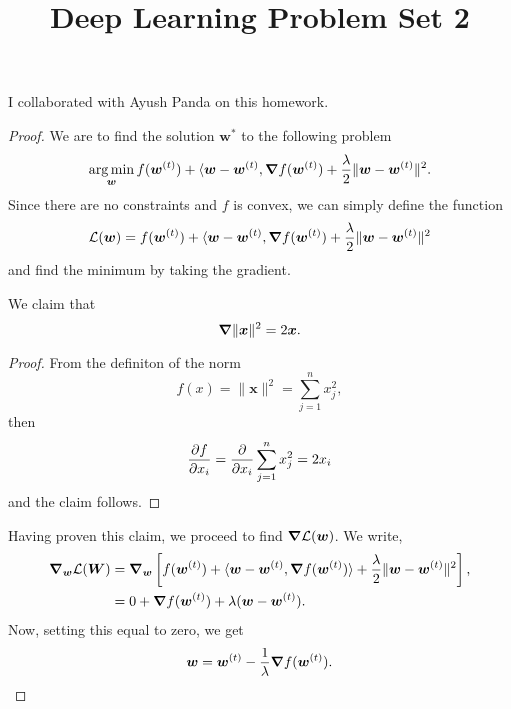 \documentclass[twoside]{article}
\title{Deep Learning Problem Set 2}
\begin{document}
\maketitle

I collaborated with Ayush Panda on this homework.

\begin{proof}
	We are to find the solution $\bm{w}^{*}$ to the following problem
	\begin{equation*}
		\operatorname*{arg\,min}_{\bm{w}} f(\bm{w}^{(t)}) + \langle \bm{w} - \bm{w}^{(t)}, \grad f(\bm{w}^{(t)})
		+ \frac{\lambda}{2} \lVert \bm{w} - \bm{w}^{(t)} \rVert^{2}.
	\end{equation*}
	Since there are no constraints and $f$ is convex, we can simply define the function
	\begin{equation*}
		\mathcal{L}(\bm{w}) = f(\bm{w}^{(t)}) + \langle \bm{w} - \bm{w}^{(t)}, \grad f(\bm{w}^{(t)})
		+ \frac{\lambda}{2} \lVert \bm{w} - \bm{w}^{(t)} \rVert^{2}
	\end{equation*}
	and find the minimum by taking the gradient.

	\begin{claim}
		We claim that
		\begin{equation*}
			\grad \lVert \bm{x} \rVert^{2} = 2\bm{x}.
		\end{equation*}
		\begin{proof}
			From the definiton of the norm
			\begin{equation*}
				f(x) = \lVert \bm{x} \rVert^{2} = \sum_{j = 1}^{n} x_{j}^{2},
			\end{equation*}
			then
			\begin{equation*}
				\pdv{f}{x_{i}} = \pdv{}{x_{i}} \sum_{j = 1}^{n} x_{j}^{2} = 2x_{i}
			\end{equation*}
			and the claim follows.
		\end{proof}
	\end{claim}

	Having proven this claim, we proceed to find $\grad \mathcal{L}(\bm{w})$. We write,
	\begin{align*}
		\grad_{\bm{w}} \mathcal{L}(\bm{W}) & = \grad_{\bm{w}}
		\left[ f(\bm{w}^{(t)}) + \langle \bm{w} - \bm{w}^{(t)}, \grad f(\bm{w}^{(t)})\rangle
		+ \frac{\lambda}{2} \lVert \bm{w} - \bm{w}^{(t)} \rVert^{2} \right],                               \\
		                                   & = 0 + \grad f(\bm{w}^{(t)}) + \lambda(\bm{w} - \bm{w}^{(t)}). \\
	\end{align*}
	Now, setting this equal to zero, we get
	\begin{equation*}
		\bm{w} = \bm{w}^{(t)} - \frac{1}{\lambda}\grad f(\bm{w}^{(t)}).
	\end{equation*}


\end{proof}
\end{document}
